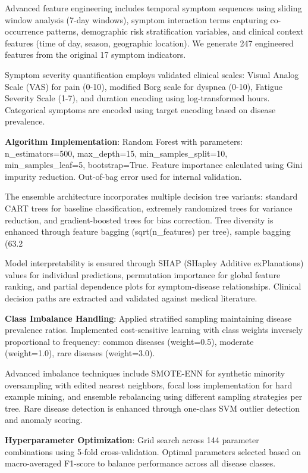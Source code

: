 \documentclass[conference]{IEEEtran}
\begin{document}
Advanced feature engineering includes temporal symptom sequences using sliding window analysis (7-day windows), symptom interaction terms capturing co-occurrence patterns, demographic risk stratification variables, and clinical context features (time of day, season, geographic location). We generate 247 engineered features from the original 17 symptom indicators.

Symptom severity quantification employs validated clinical scales: Visual Analog Scale (VAS) for pain (0-10), modified Borg scale for dyspnea (0-10), Fatigue Severity Scale (1-7), and duration encoding using log-transformed hours. Categorical symptoms are encoded using target encoding based on disease prevalence.

\textbf{Algorithm Implementation}: Random Forest with parameters: n_estimators=500, max_depth=15, min_samples_split=10, min_samples_leaf=5, bootstrap=True. Feature importance calculated using Gini impurity reduction. Out-of-bag error used for internal validation.

The ensemble architecture incorporates multiple decision tree variants: standard CART trees for baseline classification, extremely randomized trees for variance reduction, and gradient-boosted trees for bias correction. Tree diversity is enhanced through feature bagging (sqrt(n_features) per tree), sample bagging (63.2%

Model interpretability is ensured through SHAP (SHapley Additive exPlanations) values for individual predictions, permutation importance for global feature ranking, and partial dependence plots for symptom-disease relationships. Clinical decision paths are extracted and validated against medical literature.

\textbf{Class Imbalance Handling}: Applied stratified sampling maintaining disease prevalence ratios. Implemented cost-sensitive learning with class weights inversely proportional to frequency: common diseases (weight=0.5), moderate (weight=1.0), rare diseases (weight=3.0).

Advanced imbalance techniques include SMOTE-ENN for synthetic minority oversampling with edited nearest neighbors, focal loss implementation for hard example mining, and ensemble rebalancing using different sampling strategies per tree. Rare disease detection is enhanced through one-class SVM outlier detection and anomaly scoring.

\textbf{Hyperparameter Optimization}: Grid search across 144 parameter combinations using 5-fold cross-validation. Optimal parameters selected based on macro-averaged F1-score to balance performance across all disease classes.
\end{document}
